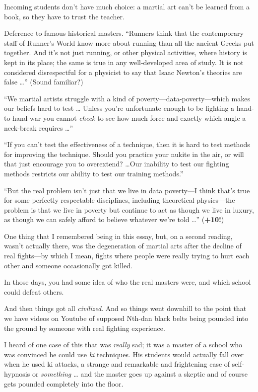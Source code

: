 {
 Incoming students don't have much choice: a
martial art can't be learned from a book, so they have
to trust the teacher.}

{
 Deference to famous historical masters. ``Runners
think that the contemporary staff of Runner's World
know more about running than all the ancient Greeks put together. And
it's not just running, or other physical activities,
where history is kept in its place; the same is true in any
well-developed area of study. It is not considered disrespectful for a
physicist to say that Isaac Newton's theories are false
\ldots'' (Sound familiar?)}

{
 ``We martial artists struggle with a kind of
poverty---data-poverty---which makes our beliefs hard to test \ldots
Unless you're unfortunate enough to be fighting a
hand-to-hand war you cannot \textit{check} to see how much force and
exactly which angle a neck-break requires \ldots''}

{
 ``If you can't test the
effectiveness of a technique, then it is hard to test methods for
improving the technique. Should you practice your nukite in the air, or
will that just encourage you to overextend? \ldots Our inability to test
our fighting methods restricts our ability to test our training
methods.''}

{
 ``But the real problem isn't just
that we live in data poverty---I think that's true for
some perfectly respectable disciplines, including theoretical
physics---the problem is that we live in poverty but continue to act as
though we live in luxury, as though we can safely afford to believe
whatever we're told \ldots''
(\textbf{+10!})}

{
 One thing that I remembered being in this essay, but, on a second
reading, wasn't actually there, was the degeneration of
martial arts after the decline of real fights---by which I mean, fights
where people were really trying to hurt each other and someone
occasionally got killed.}

{
 In those days, you had some idea of who the real masters were, and
which school could defeat others.}

{
 And then things got all \textit{civilized}. And so things went
downhill to the point that we have videos on Youtube of supposed
Nth-dan black belts being pounded into the ground by someone with real
fighting experience.}

{
 I heard of one case of this that was \textit{really} sad; it was a
master of a school who was convinced he could use \textit{ki}
techniques. His students would actually fall over when he used ki
attacks, a strange and remarkable and frightening case of self-hypnosis
or \textit{something \ldots} and the master goes up against a skeptic
and of course gets pounded completely into the floor.}

